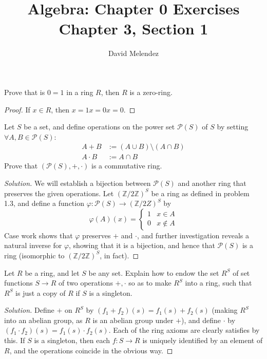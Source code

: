 \documentclass[12pt]{article}
\newenvironment{problem}[2][Problem]{\begin{trivlist}
\item[\hskip \labelsep {\bfseries #1}\hskip \labelsep {\bfseries #2.}]}{\end{trivlist}}
\newenvironment{solution}
  {\renewcommand\qedsymbol{$\blacksquare$}\begin{proof}[Solution]}
{\end{proof}}
\theoremstyle{remark}
\begin{document}
\title{Algebra: Chapter 0 Exercises\\ \large Chapter 3, Section 1}
\author{David Melendez}
\maketitle

\begin{problem}{1}
Prove that is $0=1$ in a ring $R$, then $R$ is a zero-ring.
\end{problem}
\begin{proof}
If $x\in R$, then $x=1x=0x=0$.
\end{proof}

\begin{problem}{2}
  Let $S$ be a set, and define operations on the power set $\mathscr{P}(S)$ of $S$ by setting
  $\forall A,B\in\mathscr{P}(S)$:
  \begin{align*}
    A+B &:= (A\cup B) \setminus (A\cap B) \\
    A\cdot B &:= A\cap B
  \end{align*}
  Prove that $(\mathscr{P}(S), +, \cdot)$ is a commutative ring.
\end{problem}
\begin{solution}
  We will establish a bijection between $\mathscr{P}(S)$ and another ring that preserves the given
  operations.
  Let $(\mathbb{Z}/2\mathbb{Z})^S$ be a ring as defined in problem 1.3, and define a function
  $\varphi : \mathscr{P}(S)\to (\mathbb{Z}/2{Z})^S$ by
  \begin{equation*}
    \varphi(A)(x) = 
      \begin{cases}
        1 & x\in A\\
        0 & x\notin A
      \end{cases}
  \end{equation*}
  Case work shows that $\varphi$ preserves $+$ and $\cdot$, and further investigation 
  reveals a natural inverse for $\varphi$, showing that it is a bijection, and hence
  that $\mathscr{P}(S)$ is a ring (isomorphic to $(\mathbb{Z}/2\mathbb{Z})^S$, in fact).
\end{solution}

\begin{problem}{1.3}
  Let $R$ be a ring, and let $S$ be any set.
  Explain how to endow the set $R^S$ of set functions $S\to R$ of two operations $+,\cdot$
  so as to make $R^S$ into a ring, such that $R^S$ is just a copy of $R$ if $S$ is a singleton.
\end{problem}
\begin{solution}
  Define $+$ on $R^S$ by $(f_1+f_2)(s) = f_1(s) + f_2(s)$ (making $R^S$ into an abelian group, as $R$
  is an abelian group under $+$), and define $\cdot$ by $(f_1\cdot f_2)(s)=f_1(s)\cdot f_2(s)$.
  Each of the ring axioms are clearly satisfies by this.
  If $S$ is a singleton, then each $f:S\to R$ is uniquely identified by an element of $R$, and the
  operations coincide in the obvious way.
\end{solution}
\end{document}
